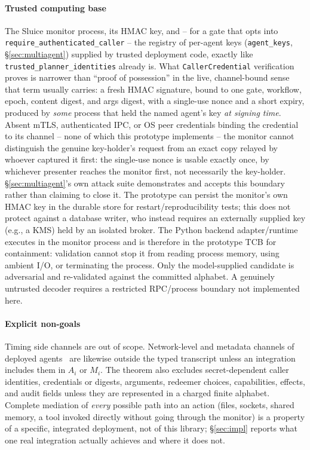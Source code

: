 \documentclass[conference,compsoc]{IEEEtran}
\newcommand{\rev}[1]{#1} %
\newcommand{\sys}{Sluice}
\begin{document}
\paragraph{Trusted computing base}
\label{sec:tcb}
The \sys{} monitor process, its HMAC key, and -- for a gate that opts into
\texttt{require\_authenticated\_caller} -- the registry of per-agent keys
(\texttt{agent\_keys}, \S\ref{sec:multiagent}) supplied by trusted
deployment code, exactly like \texttt{trusted\_planner\_identities}
already is. What \texttt{CallerCredential} verification proves is
narrower than ``proof of possession'' in the live, channel-bound sense
that term usually carries: a fresh HMAC signature, bound to one gate,
workflow, epoch, content digest, and args digest, with a single-use
nonce and a short expiry, produced by \emph{some} process that held the
named agent's key \emph{at signing time}. Absent mTLS, authenticated IPC,
or OS peer credentials binding the credential to its channel -- none of
which this prototype implements -- the monitor cannot distinguish the
genuine key-holder's request from an exact copy relayed by whoever
captured it first: the single-use nonce is usable exactly once, by
whichever presenter reaches the monitor first, not necessarily the
key-holder. \S\ref{sec:multiagent}'s own attack suite demonstrates and
accepts this boundary rather than claiming to close it. The prototype can
persist the monitor's own HMAC key in the durable store for
restart/reproducibility tests; this does not protect against a database
writer, who instead requires an externally supplied key (e.g., a KMS)
held by an isolated broker. The Python backend adapter/runtime executes in
the monitor process and is therefore in the prototype TCB for containment:
validation cannot stop it from reading process memory, using ambient I/O, or
terminating the process. Only the model-supplied candidate is adversarial and
re-validated against the committed alphabet. A genuinely untrusted decoder
requires a restricted RPC/process boundary not implemented here.

\paragraph{Explicit non-goals} Timing side channels are out of scope. \rev{Network-level and metadata channels of deployed agents~\cite{netleak2026} are likewise outside the typed transcript unless an integration includes them in $A_i$ or $M_i$.} The
theorem also excludes secret-dependent caller identities, credentials or
digests, arguments, redeemer choices, capabilities, effects, and audit fields
unless they are represented in a charged finite alphabet. Complete mediation
of \emph{every} possible path
into an action (files, sockets, shared memory, a tool invoked directly
without going through the monitor) is a property of a specific,
integrated deployment, not of this library; \S\ref{sec:impl} reports what
one real integration actually achieves and where it does not.
\end{document}
